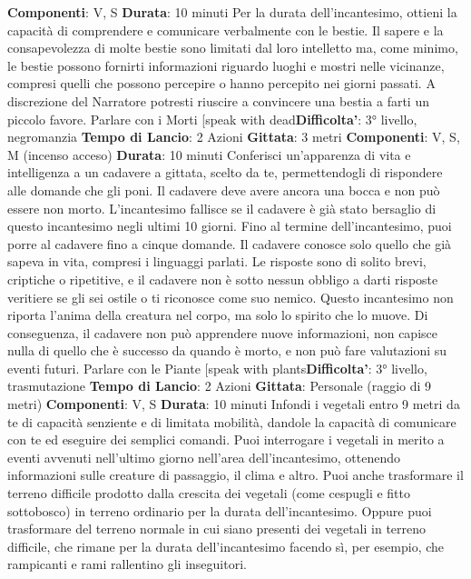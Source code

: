 \begin{multicols}{2}
\textbf{Componenti}: V, S
\textbf{Durata}: 10 minuti
Per la durata dell’incantesimo, ottieni la capacità di
comprendere e comunicare verbalmente con le bestie.
Il sapere e la consapevolezza di molte bestie sono
limitati dal loro intelletto ma, come minimo, le bestie
possono fornirti informazioni riguardo luoghi e mostri
nelle vicinanze, compresi quelli che possono percepire
o hanno percepito nei giorni passati. A discrezione del
Narratore potresti riuscire a convincere una bestia a farti un
piccolo favore.
Parlare con i Morti
[speak with dead\textbf{Difficolta'}:
3° livello, negromanzia
\textbf{Tempo di Lancio}: 2 Azioni
\textbf{Gittata}: 3 metri
\textbf{Componenti}: V, S, M (incenso acceso)
\textbf{Durata}: 10 minuti
Conferisci un’apparenza di vita e intelligenza a un
cadavere a gittata, scelto da te, permettendogli di
rispondere alle domande che gli poni. Il cadavere deve
avere ancora una bocca e non può essere non morto.
L’incantesimo fallisce se il cadavere è già stato
bersaglio di questo incantesimo negli ultimi 10 giorni.
Fino al termine dell’incantesimo, puoi porre al cadavere
fino a cinque domande. Il cadavere conosce solo quello
che già sapeva in vita, compresi i linguaggi parlati. Le
risposte sono di solito brevi, criptiche o ripetitive, e il
cadavere non è sotto nessun obbligo a darti risposte
veritiere se gli sei ostile o ti riconosce come suo
nemico. Questo incantesimo non riporta l’anima della
creatura nel corpo, ma solo lo spirito che lo muove. Di
conseguenza, il cadavere non può apprendere nuove
informazioni, non capisce nulla di quello che è
successo da quando è morto, e non può fare
valutazioni su eventi futuri.
Parlare con le Piante
[speak with plants\textbf{Difficolta'}:
3° livello, trasmutazione
\textbf{Tempo di Lancio}: 2 Azioni
\textbf{Gittata}: Personale (raggio di 9 metri)
\textbf{Componenti}: V, S
\textbf{Durata}: 10 minuti
Infondi i vegetali entro 9 metri da te di capacità
senziente e di limitata mobilità, dandole la capacità di
comunicare con te ed eseguire dei semplici comandi.
Puoi interrogare i vegetali in merito a eventi avvenuti
nell’ultimo giorno nell’area dell’incantesimo, ottenendo
informazioni sulle creature di passaggio, il clima e altro.
Puoi anche trasformare il terreno difficile prodotto dalla
crescita dei vegetali (come cespugli e fitto sottobosco)
in terreno ordinario per la durata dell’incantesimo.
Oppure puoi trasformare del terreno normale in cui
siano presenti dei vegetali in terreno difficile, che
rimane per la durata dell’incantesimo facendo sì, per
esempio, che rampicanti e rami rallentino gli inseguitori.

\end{multicols}
